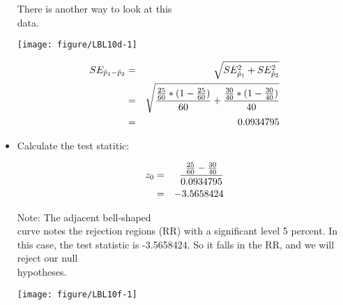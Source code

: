 \documentclass[11pt]{book}\usepackage[]{graphicx}\usepackage[]{color}
\begin{document}
\begin{itemize}
\begin{minipage}[h]{6cm}
\end{minipage} \hfill
\begin{minipage}[h]{6cm}

There is another way to look at this \\ data.



{\centering \texttt{[image: figure/LBL10d-1]} 

}




\end{minipage}

\begin{eqnarray*}
    SE_{\hat{p}_1-\hat{p}_2} &=& \sqrt{SE_{\hat{p}_1}^2 + SE_{\hat{p}_2}^2} \\
             &=& \sqrt{ \frac{\frac{25}{60} *(1 - \frac{25}{60})}{60} + \frac{\frac{30}{40} * (1 - \frac{30}{40})}{40} } \\ \vspace{3mm}
             &=& 0.0934795
  \end{eqnarray*}


  \item Calculate the test statitic:

    \begin{eqnarray*}
    z_0 &=& \frac{\frac{25}{60} - \frac{30}{40}}{0.0934795} \\ \vspace{3mm}
        &=& -3.5658424
    \end{eqnarray*}

\begin{minipage}[ht]{6cm}

Note: The adjacent bell-shaped \\ curve notes the rejection regions (RR) with a significant level 5 percent.  In this case, the test statistic is -3.5658424.  So it falls in the RR, and we will reject our null \\ hypotheses.

\end{minipage} \hfill
\begin{minipage}[ht]{6cm}



{\centering \texttt{[image: figure/LBL10f-1]} 

}





\end{minipage}

\newpage


\end{itemize}
\end{document}
